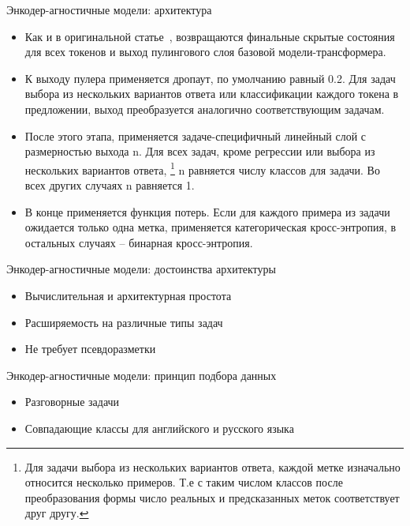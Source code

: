 \begin{frame}{Энкодер-агностичные модели: архитектура}
\begin{itemize}

  \item Как и в оригинальной статье~\cite{bert}, возвращаются финальные скрытые состояния для всех токенов и выход пулингового слоя базовой модели-трансформера. 
  
  \item К выходу пулера применяется дропаут, по умолчанию равный 0.2. Для задач выбора из нескольких вариантов ответа или классификации каждого токена в предложении, выход преобразуется аналогично соответствующим задачам.

  \item После этого этапа, применяется задаче-специфичный линейный слой с размерностью выхода {n}. Для всех задач, кроме регрессии или выбора из нескольких вариантов ответа, \footnote{Для задачи выбора из нескольких вариантов ответа, каждой метке изначально относится несколько примеров. Т.е с таким числом классов после преобразования формы число реальных и предсказанных меток соответствует друг другу.} {n} равняется числу классов для задачи. Во всех других случаях {n} равняется 1.
 
  \item В конце применяется функция потерь. Если для каждого примера из задачи ожидается только одна метка, применяется категорическая кросс-энтропия, в остальных случаях -- бинарная кросс-энтропия. 

\end{itemize}
\end{frame}

\begin{frame}{Энкодер-агностичные модели: достоинства архитектуры}
\begin{itemize}

  \item Вычислительная и архитектурная простота
  \item Расширяемость на различные типы задач
  \item Не требует псевдоразметки

\end{itemize}
\end{frame}

\begin{frame}{Энкодер-агностичные модели: принцип подбора данных}
\begin{itemize}
    \item Разговорные задачи
    \item Совпадающие классы для английского и русского языка
\end{itemize}
\end{frame}

